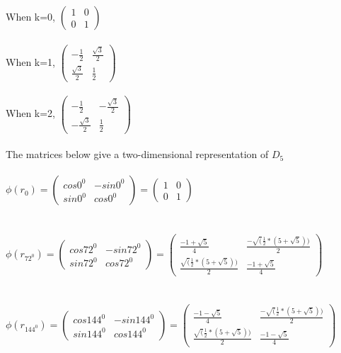 \documentclass{article}
\begin{document}
When k=0, $\begin{pmatrix}
    1 & 0\\
    0 & 1
\end{pmatrix}$\\\\



When k=1, $\begin{pmatrix}
     - \frac{1}{2} & \frac{\sqrt{3}}{2}\\
    \frac{\sqrt{3}}{2}& \frac{1}{2}
\end{pmatrix}$\\\\

When k=2, 
$\begin{pmatrix}
     - \frac{1}{2} & -\frac{\sqrt{3}}{2}\\
    -\frac{\sqrt{3}}{2}& \frac{1}{2}
\end{pmatrix}$\\\\


\Large{The matrices below give a two-dimensional representation of $D_5$ }\\

\\
$\phi (r_0) = 
\begin{pmatrix}
cos 0^0 & -sin 0^0\\
sin 0^0 & cos0^0
\end{pmatrix} =
\begin{pmatrix}
1 & 0\\
0 & 1
\end{pmatrix} $\\\\

\\
$\phi (r_{72^0}) = 
\begin{pmatrix}
cos 72^0 & -sin 72^0\\
sin 72^0 & cos72^0
\end{pmatrix} =
\begin{pmatrix}
\frac{-1+\sqrt{5}}{4} & \frac{-\sqrt(\frac{1}{2}*(5+\sqrt{5}))}{2}\\
\frac{\sqrt(\frac{1}{2}*(5+\sqrt{5}))}{2}& \frac{-1+\sqrt{5}}{4}
\end{pmatrix} $\\\\

\\
$\phi (r_{144^0}) = 
\begin{pmatrix}
cos 144^0 & -sin 144^0\\
sin 144^0 & cos144^0
\end{pmatrix} =
\begin{pmatrix}
\frac{-1-\sqrt{5}}{4} & \frac{-\sqrt(\frac{1}{2}*(5+\sqrt{5}))}{2}\\
\frac{\sqrt(\frac{1}{2}*(5+\sqrt{5}))}{2}& \frac{-1-\sqrt{5}}{4}
\end{pmatrix} $\\\\
\end{document}
